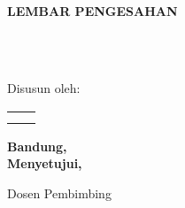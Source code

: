 \chapter*{}


    \begin{center}
    \textbf{LEMBAR PENGESAHAN}\\

	\vspace*{1 cm}

    \textbf{\Judul}\\
    \textit{\textbf{\JudulInggris}}\\
    
	\vspace*{1 cm}
    
    
	\vspace*{1.0cm}    
    
    Disusun oleh:\\
    \vspace*{0.5 cm} 
 	\begin{tabular}{ll}
	\penulistu 	& \nimtu \\
	\penulisdu 		& \nimdu \\
	\end{tabular}

    \vspace*{1.0cm}
    \textbf{Bandung, \tanggalPengesahan\\
    \vspace*{0.5 cm} 
    Menyetujui,}

    Dosen Pembimbing \\ [0.5 cm]
    $ $ \\ [0.5 cm]
    \pembimbingSatu\\
    \nikSatu 

     \end{center}
    